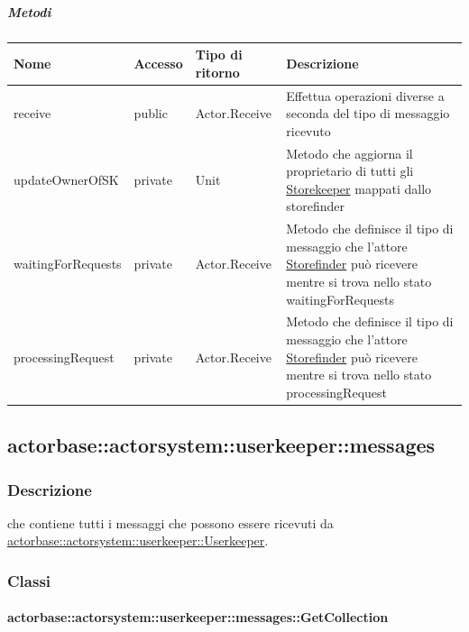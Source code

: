 \documentclass{scalatekids-article}
\begin{document}
\subparagraph{Metodi}
\begin{tabular}{| l | l | l | l |}
  \hline
  Nome & Accesso & Tipo di ritorno & Descrizione\\
  \hline
  receive & public & Actor.Receive  & Effettua operazioni diverse a seconda del tipo di messaggio ricevuto\\
  \hline
  updateOwnerOfSK & private &  Unit & Metodo che aggiorna il proprietario di tutti gli \hyperref[sec:actorbase::actorsystem::storekeeper::Storekeeper]{Storekeeper} mappati dallo storefinder\\
  \hline
  waitingForRequests & private & Actor.Receive & Metodo che definisce il tipo di messaggio che l'attore \hyperref[sec:actorbase::actorsystem::storefinder::Storefinder]{Storefinder} può ricevere mentre si trova nello stato waitingForRequests\\
  \hline
  processingRequest & private & Actor.Receive & Metodo che definisce il tipo di messaggio che l'attore \hyperref[sec:actorbase::actorsystem::main::storefinder::Storefinder]{Storefinder} può ricevere mentre si trova nello stato processingRequest\\
  \hline
\end{tabular}

\subsection{actorbase::actorsystem::userkeeper::messages}
\label{sec:actorbase::actorsystem::userkeeper::messages}

\subsubsection{Descrizione}

 che contiene tutti i messaggi che possono essere ricevuti da
\hyperref[sec:actorbase::actorsystem::userkeeper::Userkeeper]{actorbase::actorsystem::userkeeper::Userkeeper}.

\subsubsection{Classi}

\paragraph{actorbase::actorsystem::userkeeper::messages::GetCollection}
\label{sec:actorbase::actorsystem::userkeeper::messages::GetCollection}
\end{document}
